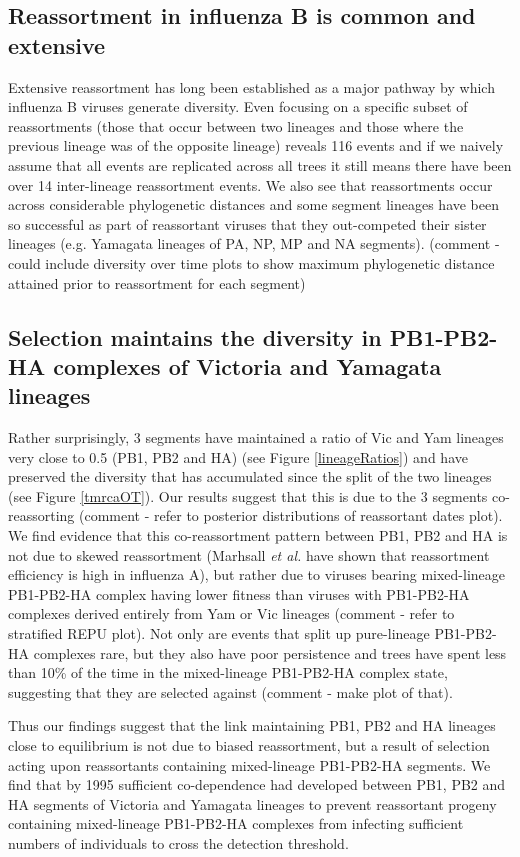 \documentclass[11pt,oneside,letterpaper]{article}
\begin{document}
\subsection*{Reassortment in influenza B is common and extensive}
Extensive reassortment has long been established as a major pathway by which influenza B viruses generate diversity.
Even focusing on a specific subset of reassortments (those that occur between two lineages and those where the previous lineage was of the opposite lineage) reveals 116 events and if we naively assume that all events are replicated across all trees it still means there have been over 14 inter-lineage reassortment events.
We also see that reassortments occur across considerable phylogenetic distances and some segment lineages have been so successful as part of reassortant viruses that they out-competed their sister lineages (e.g. Yamagata lineages of PA, NP, MP and NA segments). (comment - could include diversity over time plots to show maximum phylogenetic distance attained prior to reassortment for each segment)


\subsection*{Selection maintains the diversity in PB1-PB2-HA complexes of Victoria and Yamagata lineages}
Rather surprisingly, 3 segments have maintained a ratio of Vic and Yam lineages very close to 0.5 (PB1, PB2 and HA) (see Figure \ref{lineageRatios}) and have preserved the diversity that has accumulated since the split of the two lineages (see Figure \ref{tmrcaOT}).
Our results suggest that this is due to the 3 segments co-reassorting (comment - refer to posterior distributions of reassortant dates plot).
We find evidence that this co-reassortment pattern between PB1, PB2 and HA is not due to skewed reassortment (Marhsall \textit{et al.} \cite{marshall2013} have shown that reassortment efficiency is high in influenza A), but rather due to viruses bearing mixed-lineage PB1-PB2-HA complex having lower fitness than viruses with PB1-PB2-HA complexes derived entirely from Yam or Vic lineages (comment - refer to stratified REPU plot).
Not only are events that split up pure-lineage PB1-PB2-HA complexes rare, but they also have poor persistence and trees have spent less than 10\% of the time in the mixed-lineage PB1-PB2-HA complex state, suggesting that they are selected against (comment - make plot of that).

Thus our findings suggest that the link maintaining PB1, PB2 and HA lineages close to equilibrium is not due to biased reassortment, but a result of selection acting upon reassortants containing mixed-lineage PB1-PB2-HA segments.
We find that by 1995 sufficient co-dependence had developed between PB1, PB2 and HA segments of Victoria and Yamagata lineages to prevent reassortant progeny containing mixed-lineage PB1-PB2-HA complexes from infecting sufficient numbers of individuals to cross the detection threshold.
\end{document}
